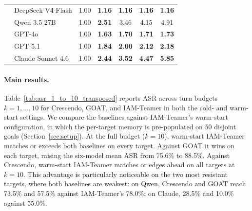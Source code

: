 \documentclass[a4paper,fleqn]{cas-sc}
\begin{document}
\begin{table}[t]
\begin{tabular}{llccccc}
                   & DeepSeek-V4-Flash & 1.00                       & \textbf{1.16}              & \textbf{1.16}              & \textbf{1.16}              & \textbf{1.16}               \\
                   & Qwen 3.5 27B      & 1.00                       & \textbf{2.51}              & 3.46                       & 4.15                       & 4.91                        \\
                   & GPT-4o            & 1.00                       & \textbf{1.63}              & \textbf{1.70}              & \textbf{1.71}              & \textbf{1.73}               \\
                   & GPT-5.1           & 1.00                       & \textbf{1.84}              & \textbf{2.00}              & \textbf{2.12}              & \textbf{2.18}               \\
                   & Claude Sonnet 4.6 & 1.00                       & \textbf{2.44}              & \textbf{3.52}              & \textbf{4.47}              & \textbf{5.85}               \\
    \bottomrule
  \end{tabular}
\end{table}

\paragraph{Main results.}
Table~\ref{tab:asr_1_to_10_transposed} reports ASR across turn budgets $k=1,\dots,10$ for Crescendo, GOAT, and IAM-Teamer in both the cold- and warm-start settings.
We compare the baselines against IAM-Teamer's warm-start configuration, in which the per-target memory is pre-populated on 50 disjoint goals (Section~\ref{sec:setup}).
At the full budget ($k=10$), warm-start IAM-Teamer matches or exceeds both baselines on every target.
Against GOAT it wins on each target, raising the six-model mean ASR from 75.6\% to 88.5\%.
Against Crescendo, warm-start IAM-Teamer matches or edges ahead on all targets at $k=10$.
This advantage is particularly noticeable on the two most resistant targets, where both baselines are weakest: on Qwen, Crescendo and GOAT reach 73.5\% and 57.5\% against IAM-Teamer's 78.0\%; on Claude, 28.5\% and 10.0\% against 55.0\%.
\end{document}
